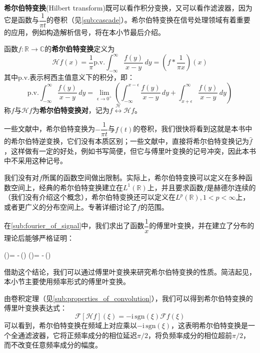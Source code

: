 \documentclass{ctexbook}
\begin{document}
\textbf{希尔伯特变换}(Hilbert transform)既可以看作积分变换，又可以看作滤波器，因为它是函数与$\dfrac{1}{\pi t}$的卷积（见\ref{sub:cascade}）。希尔伯特变换在信号处理领域有着重要的应用，例如构造解析信号，将在本小节最后介绍。
\begin{definition}[希尔伯特变换]
    函数$f:\mathbb{R}\to\mathbb{C}$的\textbf{希尔伯特变换}定义为
    \[\mathcal{H} f(x)=\frac{1}{\pi}\text{p.v.}\int_{-\infty}^{\infty}\frac{f(y)}{x-y}\,dy=\left(f*\frac{1}{\pi x}\right)(x)\]
    其中p.v.表示柯西主值意义下的积分\cite{hilbert_transform}，即：
    \[\text{p.v.}\int_{-\infty}^{\infty}\frac{f(y)}{x-y}\,dy=\lim_{\epsilon\to 0^+}\left(\int_{-\infty}^{x-\epsilon}\frac{f(y)}{x-y}\,dy+\int_{x+\epsilon}^{\infty}\frac{f(y)}{x-y}\,dy\right)\]
    称$f$与$\mathcal{H} f$为\textbf{希尔伯特变换对}，记为$f\overset{\mathcal{H} }{\longleftrightarrow} \mathcal{H} f$。
\end{definition}
\begin{remark}
    一些文献中\cite{brad_osgood_ee261}，希尔伯特变换为$-\dfrac{1}{\pi t}$与$f(t)$的卷积，我们很快将看到这就是本书中的希尔伯特逆变换，它们没有本质区别；一些文献中\cite{signal_systems}，直接将希尔伯特变换记为$\hat{f}$，这样做有一定的好处，例如书写简便，但它与傅里叶变换的记号冲突，因此本书中不采用这种记号。
\end{remark}
\begin{remark}
    我们没有对$f$所属的函数空间做出限制。实际上，希尔伯特变换可以定义在多种函数空间上，经典的希尔伯特变换建立在$L^1(\mathbb{R})$上，并且要求函数$f$是赫德尔连续的（我们没有介绍这个概念），希尔伯特变换还可以定义在$L^p(\mathbb{R}),1<p<\infty$上，或者更广义的分布空间上。专著\cite{hilbert_transform}详细讨论了$f$的范围。
\end{remark}

在\ref{sub:fourier_of_signal}中，我们求出了函数$\dfrac{1}{x}$的傅里叶变换，并在建立了分布的理论后能够严格证明：
\begin{lralign}
     (\xi)= -\,(\xi)
    \switch
     (\omega)= -\,(\omega)
\end{lralign}

借助这个结论，我们可以通过傅里叶变换来研究希尔伯特变换的性质。简洁起见，本小节主要使用频率形式的傅里叶变换。

由卷积定理（见\ref{sub:properties_of_convolution}），我们可以得到希尔伯特变换的傅里叶变换表达式：
    \[\mathcal{F} [\mathcal{H} f](\xi)=-\mathrm{i}\,\text{sgn}(\xi)\mathcal{F} f(\xi)\]
可以看到，希尔伯特变换在频域上对应乘以$-\mathrm{i}\,\text{sgn}(\xi)$，这表明希尔伯特变换是一个全通滤波器，它将正频率成分的相位延迟$\pi/2$，将负频率成分的相位超前$\pi/2$，而不改变任意频率成分的幅度。
\end{document}
